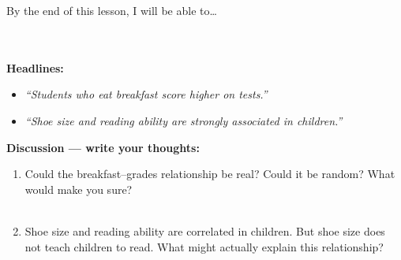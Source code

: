 \documentclass[10pt]{article}
\begin{document}
\namedateperiod

\vspace{0.12in}

\begin{objectivebox}
\small By the end of this lesson, I will be able to\dots\\[4pt]
\writeline\\[1pt]
\writeline\\[1pt]
\writeline
\end{objectivebox}

\vspace{0.1in}

\begin{vocabbox}
\end{vocabbox}

\vspace{0.1in}

\begin{hookbox}
\small\textbf{Headlines:}
\begin{itemize}[leftmargin=1.3em, itemsep=2pt]
  \item \textit{``Students who eat breakfast score higher on tests.''}
  \item \textit{``Shoe size and reading ability are strongly associated in children.''}
\end{itemize}

\vspace{6pt}
\textbf{Discussion --- write your thoughts:}
\begin{enumerate}[leftmargin=1.5em, itemsep=2pt]
  \item Could the breakfast--grades relationship be real? Could it be random? What would make you sure?\\
        \writeline\\[1pt]\writeline

  \item Shoe size and reading ability are correlated in children. But shoe size does not teach children to read.
        What might actually explain this relationship?\\
        \writeline\\[1pt]\writeline
\end{enumerate}
\end{hookbox}
\end{document}

